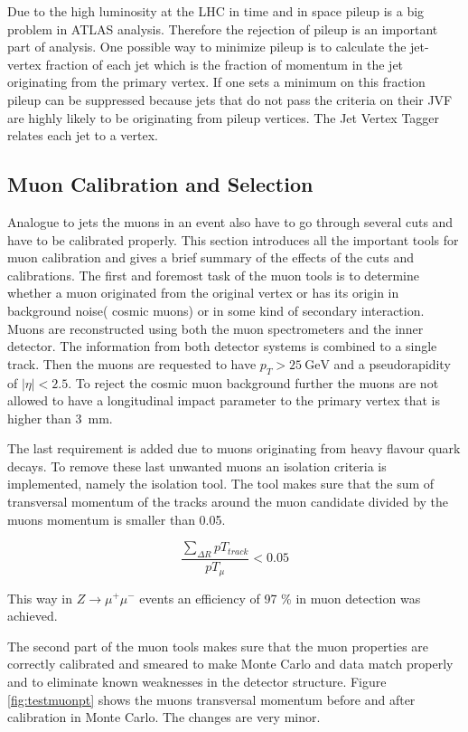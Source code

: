 Due to the high luminosity at the LHC in time and in space pileup is a big problem in ATLAS analysis. Therefore the rejection of pileup is an important part of analysis. One possible way to minimize pileup is to calculate the jet-vertex fraction of each jet which is the fraction of momentum in the jet originating from the primary vertex. If one sets a minimum on this fraction pileup can be suppressed because jets that do not pass the criteria on their JVF are highly likely to be originating from pileup vertices. The Jet Vertex Tagger relates each jet to a vertex.


\subsection{Muon Calibration and Selection}

Analogue to jets the muons in an event also have to go through several cuts and have to be calibrated properly. This section introduces all the important tools for muon calibration and gives a brief summary of the effects of the cuts and calibrations.
The first and foremost task of the muon tools is to determine whether a muon originated from the original vertex or has its origin in background noise( cosmic muons) or in some kind of secondary interaction. Muons are reconstructed using both the muon spectrometers and the inner detector. The information from both detector systems is combined to a single track. Then the muons are requested to have $p_T > \SI{25}{\GeV}$ and a pseudorapidity of $|\eta| < \num{2.5}$. To reject the cosmic muon background further the muons are not allowed to have a longitudinal impact parameter to the primary vertex that is higher than \SI{3}{\mm}. 

The last requirement is added due to muons originating from heavy flavour quark decays.
To remove these last unwanted muons an isolation criteria is implemented, namely the isolation tool. The tool makes sure that the sum of transversal momentum of the tracks around the muon candidate divided by the muons momentum is smaller than \num{0.05}. 

\begin{equation}
\frac{\sum_{\Delta R}pT_{track}}{pT_{\mu}} < 0.05
\end{equation}

This way in $Z \rightarrow \mu^+ \mu^-$ events an efficiency of \num{97} \% in muon detection was achieved.

The second part of the muon tools makes sure that the muon properties are correctly calibrated and smeared to make Monte Carlo and data match properly and to eliminate known weaknesses in the detector structure. Figure \ref{fig:testmuonpt} shows the muons transversal momentum before and after calibration in Monte Carlo. The changes are very minor.

